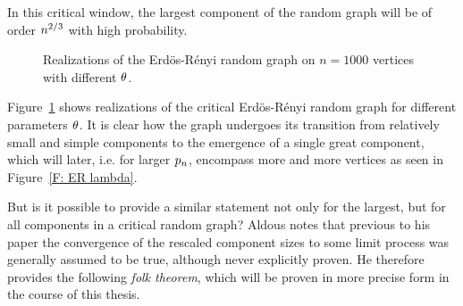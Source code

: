 In this critical window, the largest component of the random graph will be of order $n^{2 / 3}$ with high probability.

\begin{figure}[h]
	\centering
	\quad
	\quad
	\caption{Realizations of the Erdös-Rényi random graph on $n=1000$ vertices with different $\theta$.}%
	\label{F: ER p}%
\end{figure}

Figure~\ref{F: ER p} shows realizations of the critical Erdös-Rényi random graph for different parameters $\theta$.
It is clear how the graph undergoes its transition from relatively small and simple components 
to the emergence of a single great component, which will later, i.e. for larger $p_n$,
encompass more and more vertices as seen in Figure~\ref{F: ER lambda}.


But is it possible to provide a similar statement not only for the largest, but for all components in a critical random graph?
Aldous notes that previous to his paper
the convergence of the rescaled component sizes to some limit process was generally assumed to be true,
although never explicitly proven.
He therefore provides the following \emph{folk theorem},
which will be proven in more precise form in the course of this thesis.

